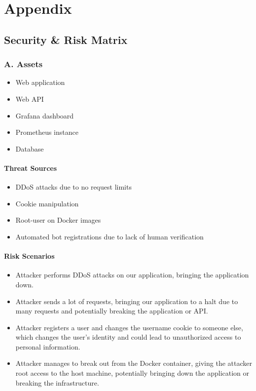 \thispagestyle{empty}
\newpage
\appendix %
\section{Appendix}

\subsection{Security \& Risk Matrix} \label{appendix:security_and_risk}
\subsubsection*{A. Assets}
\begin{itemize}
    \item Web application
    \item Web API
    \item Grafana dashboard
    \item Prometheus instance
    \item Database
\end{itemize}

\paragraph{Threat Sources}
\begin{itemize}
    \item DDoS attacks due to no request limits
    \item Cookie manipulation
    \item Root-user on Docker images
    \item Automated bot registrations due to lack of human verification
\end{itemize}

\paragraph{Risk Scenarios}
\begin{itemize}
    \item Attacker performs DDoS attacks on our application, bringing the application down.
    \item Attacker sends a lot of requests, bringing our application to a halt due to many requests and potentially breaking the application or API.
    \item Attacker registers a user and changes the username cookie to someone else, which changes the user's identity and could lead to unauthorized access to personal information.
    \item Attacker manages to break out from the Docker container, giving the attacker root access to the host machine, potentially bringing down the application or breaking the infrastructure.
\end{itemize}

